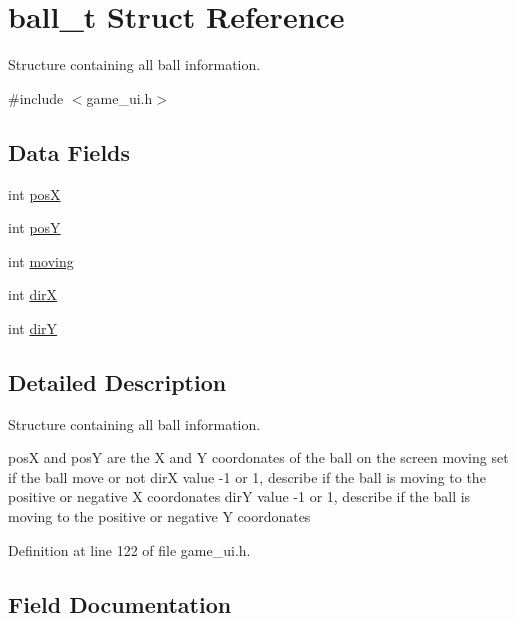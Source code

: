 \hypertarget{structball__t}{}\section{ball\+\_\+t Struct Reference}
\label{structball__t}


Structure containing all ball information.  




{\ttfamily \#include $<$game\+\_\+ui.\+h$>$}

\subsection*{Data Fields}
\begin{DoxyCompactItemize}
\item 
int \hyperlink{structball__t_ab34f89ef94db9dd6d3a04425dd6d9c9d}{posX}
\item 
int \hyperlink{structball__t_a65ab2de052c17234c8a1db3fd3b868a9}{posY}
\item 
int \hyperlink{structball__t_ad892143587536d5edaac114b6d9b38f6}{moving}
\item 
int \hyperlink{structball__t_a349642fac223cab55f7a69e068423424}{dirX}
\item 
int \hyperlink{structball__t_aaa2cc03cc9f201b80d903336a92173a9}{dirY}
\end{DoxyCompactItemize}


\subsection{Detailed Description}
Structure containing all ball information. 

posX and posY are the X and Y coordonates of the ball on the screen moving set if the ball move or not dirX value -\/1 or 1, describe if the ball is moving to the positive or negative X coordonates dirY value -\/1 or 1, describe if the ball is moving to the positive or negative Y coordonates 

Definition at line 122 of file game\+\_\+ui.\+h.



\subsection{Field Documentation}
\mbox{\label{structball__t_a349642fac223cab55f7a69e068423424}} 
